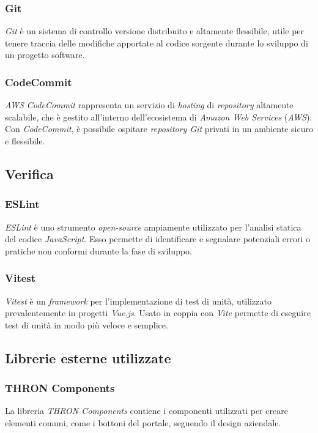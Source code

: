 \subsubsection{Git}\label{subsubsec:git}
\textit{Git} è un sistema di controllo versione distribuito e altamente flessibile, utile per tenere traccia delle modifiche apportate al codice sorgente durante lo sviluppo di un progetto software.
\subsubsection{CodeCommit}\label{subsubsec:CodeCommit}
\textit{AWS CodeCommit} rappresenta un servizio di \textit{hosting} di \textit{repository} altamente scalabile, che è gestito all'interno dell'ecosistema di \textit{Amazon Web Services} (\textit{AWS}). 
Con \textit{CodeCommit}, è possibile ospitare \textit{repository Git} privati in un ambiente sicuro e flessibile.

\subsection{Verifica}\label{subsec:verifica}
\subsubsection{ESLint}\label{subsubsec:eslint}
\textit{ESLint} è uno strumento \textit{open-source} ampiamente utilizzato per l'analisi statica del codice \textit{JavaScript}. Esso permette di identificare e segnalare potenziali errori o pratiche non conformi durante la fase di sviluppo.
\subsubsection{Vitest}\label{subsubsec:vitest}
\textit{Vitest} è un \textit{framework} per l'implementazione di test di unità, utilizzato prevalentemente in progetti \textit{Vue.js}.
Usato in coppia con \textit{Vite} permette di eseguire test di unità in modo più veloce e semplice.

\subsection{Librerie esterne utilizzate}\label{subsec:librerie-esterne}
\subsubsection{THRON Components}\label{subsubsec:thron-components}
La libreria \textit{THRON Components} contiene i componenti utilizzati per creare elementi comuni, come i bottoni del portale, seguendo il design aziendale.
